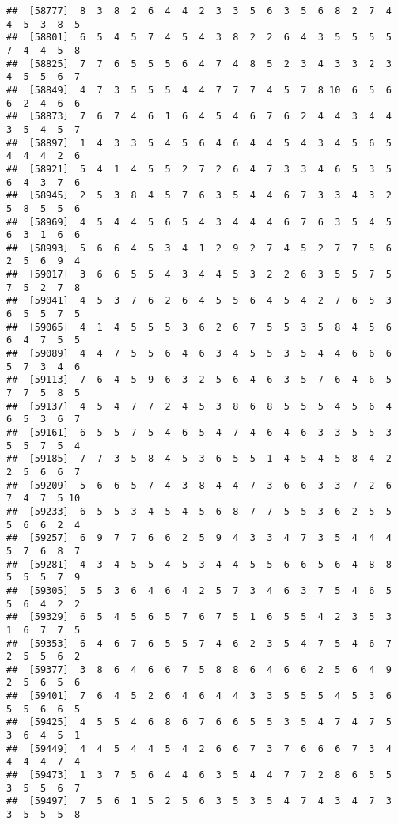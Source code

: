 \documentclass[
]{book}
\begin{document}
\begin{verbatim}
##  [58777]  8  3  8  2  6  4  4  2  3  3  5  6  3  5  6  8  2  7  4  4  5  3  8  5
##  [58801]  6  5  4  5  7  4  5  4  3  8  2  2  6  4  3  5  5  5  5  7  4  4  5  8
##  [58825]  7  7  6  5  5  5  6  4  7  4  8  5  2  3  4  3  3  2  3  4  5  5  6  7
##  [58849]  4  7  3  5  5  5  4  4  7  7  7  4  5  7  8 10  6  5  6  6  2  4  6  6
##  [58873]  7  6  7  4  6  1  6  4  5  4  6  7  6  2  4  4  3  4  4  3  5  4  5  7
##  [58897]  1  4  3  3  5  4  5  6  4  6  4  4  5  4  3  4  5  6  5  4  4  4  2  6
##  [58921]  5  4  1  4  5  5  2  7  2  6  4  7  3  3  4  6  5  3  5  6  4  3  7  6
##  [58945]  2  5  3  8  4  5  7  6  3  5  4  4  6  7  3  3  4  3  2  5  8  5  5  6
##  [58969]  4  5  4  4  5  6  5  4  3  4  4  4  6  7  6  3  5  4  5  6  3  1  6  6
##  [58993]  5  6  6  4  5  3  4  1  2  9  2  7  4  5  2  7  7  5  6  2  5  6  9  4
##  [59017]  3  6  6  5  5  4  3  4  4  5  3  2  2  6  3  5  5  7  5  7  5  2  7  8
##  [59041]  4  5  3  7  6  2  6  4  5  5  6  4  5  4  2  7  6  5  3  6  5  5  7  5
##  [59065]  4  1  4  5  5  5  3  6  2  6  7  5  5  3  5  8  4  5  6  6  4  7  5  5
##  [59089]  4  4  7  5  5  6  4  6  3  4  5  5  3  5  4  4  6  6  6  5  7  3  4  6
##  [59113]  7  6  4  5  9  6  3  2  5  6  4  6  3  5  7  6  4  6  5  7  7  5  8  5
##  [59137]  4  5  4  7  7  2  4  5  3  8  6  8  5  5  5  4  5  6  4  6  5  3  6  7
##  [59161]  6  5  5  7  5  4  6  5  4  7  4  6  4  6  3  3  5  5  3  5  5  7  5  4
##  [59185]  7  7  3  5  8  4  5  3  6  5  5  1  4  5  4  5  8  4  2  2  5  6  6  7
##  [59209]  5  6  6  5  7  4  3  8  4  4  7  3  6  6  3  3  7  2  6  7  4  7  5 10
##  [59233]  6  5  5  3  4  5  4  5  6  8  7  7  5  5  3  6  2  5  5  5  6  6  2  4
##  [59257]  6  9  7  7  6  6  2  5  9  4  3  3  4  7  3  5  4  4  4  5  7  6  8  7
##  [59281]  4  3  4  5  5  4  5  3  4  4  5  5  6  6  5  6  4  8  8  5  5  5  7  9
##  [59305]  5  5  3  6  4  6  4  2  5  7  3  4  6  3  7  5  4  6  5  5  6  4  2  2
##  [59329]  6  5  4  5  6  5  7  6  7  5  1  6  5  5  4  2  3  5  3  1  6  7  7  5
##  [59353]  6  4  6  7  6  5  5  7  4  6  2  3  5  4  7  5  4  6  7  2  5  5  6  2
##  [59377]  3  8  6  4  6  6  7  5  8  8  6  4  6  6  2  5  6  4  9  2  5  6  5  6
##  [59401]  7  6  4  5  2  6  4  6  4  4  3  3  5  5  5  4  5  3  6  5  5  6  6  5
##  [59425]  4  5  5  4  6  8  6  7  6  6  5  5  3  5  4  7  4  7  5  3  6  4  5  1
##  [59449]  4  4  5  4  4  5  4  2  6  6  7  3  7  6  6  6  7  3  4  4  4  4  7  4
##  [59473]  1  3  7  5  6  4  4  6  3  5  4  4  7  7  2  8  6  5  5  3  5  5  6  7
##  [59497]  7  5  6  1  5  2  5  6  3  5  3  5  4  7  4  3  4  7  3  3  5  5  5  8

\end{verbatim}
\end{document}
